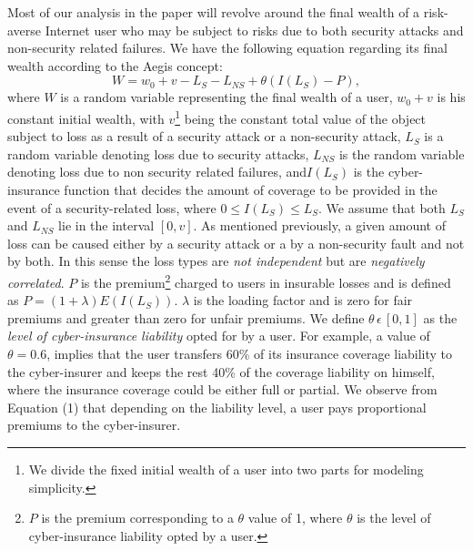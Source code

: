 \documentclass[letterpaper,12pt, onecolumn, nodraft]{IEEEtran}
\begin{document}
Most of our analysis in the paper will revolve around the final wealth of a risk-averse Internet user who may be subject to risks due to both security attacks and non-security related failures. We have the following equation regarding its final wealth according to the Aegis concept:
\begin{equation}
W = w_{0} + v - L_{S} - L_{NS} + \theta(I(L_{S}) - P),
\end{equation}
where $W$ is a random variable representing the final wealth of a user, $w_{0} + v$ is his constant initial wealth, with $v$\footnote{We divide the fixed initial wealth of a user into two parts for modeling simplicity.} being the constant total value of the object subject to loss as a result of a security attack or a non-security attack, $L_{S}$ is a random variable denoting loss due to security attacks, $L_{NS}$ is the random variable denoting loss due to non security related failures, and$I(L_{S})$ is the cyber-insurance function that decides the amount of coverage to be provided in the event of a security-related loss, where $0\le I(L_{S}) \le L_{S}$. We assume that both $L_{S}$ and $L_{NS}$ lie in the interval $[0,v]$. As mentioned previously, a given amount of loss can be caused either by a security attack or a by a non-security fault and not by both. In this sense the loss types are \emph{not independent} but are \emph{negatively correlated}. $P$ is the premium\footnote{$P$ is the premium corresponding to a $\theta$ value of 1, where $\theta$ is the level of cyber-insurance liability opted by a user.} charged to users in insurable losses and is defined as $P = (1 + \lambda)E(I(L_{S}))$. $\lambda $ is the loading factor and is zero for fair premiums and greater than zero for unfair premiums. We define $\theta\,\epsilon\,[0,1]$ as the \emph{level of cyber-insurance liability} opted for by a user. For example, a value of $\theta = 0.6$, implies that the user transfers 60\% of its insurance coverage liability to the cyber-insurer and keeps the rest 40\% of the coverage liability on himself, where the insurance coverage could be either full or partial. We observe from Equation (1) that depending on the liability level, a user pays proportional premiums to the cyber-insurer.
\end{document}
